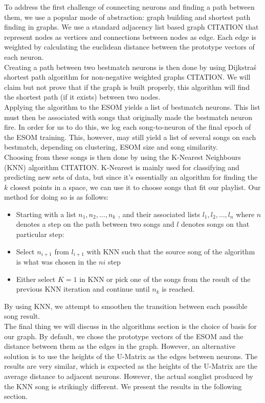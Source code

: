 To address the first challenge of connecting neurons and finding a path between them, we use a popular mode of abstraction: graph building and shortest path finding in graphs. We use a standard adjacency list based graph CITATION that represent nodes as vertices and connections between nodes as edge. Each edge is weighted by calculating the euclidean distance between the prototype vectors of each neuron. \\
Creating a path between two bestmatch neurons is then done by using Dijkstra\'s shortest path algorithm for non-negative weighted graphs CITATION. We will claim but not prove that if the graph is built properly, this algorithm will find the shortest path (if it exists) between two nodes. \\

Applying the algorithm to the ESOM yields a list of bestmatch neurons. This list must then be associated with songs that originally made the bestmatch neuron fire. In order for us to do this, we log each song-to-neuron of the final epoch of the ESOM training. This, however, may still yield a list of several songs on each bestmatch, depending on clustering, ESOM size and song similarity. \\
Choosing from these songs is then done by using the K-Nearest Neighbours (KNN) algorithm CITATION. K-Nearest is mainly used for classifying and predicting new sets of data, but since it's essentially an algorithm for finding the $k$ closest points in a space, we can use it to choose songs that fit our playlist. Our method for doing so is as follows:

\begin{itemize}
\item Starting with a list $ n_1, n_2, \dots, n_k $ , and their associated lists $ l_1, l_2, \dots, l_n $ where $n$ denotes a step on the path between two songs and $l$ denotes songs on that particular step: \\
\item Select $ n_{i+1} $ from $ l_{i+1} $ with KNN such that the source song of the algorithm is what was chosen in the $ n{i} $ step \\
\item Either select $K = 1$ in KNN or pick one of the songs from the result of the previous KNN iteration and continue until $n_k$ is reached.\\
\end{itemize}
By using KNN, we attempt to smoothen the transition between each possible song result. \\
The final thing we will discuss in the algorithms section is the choice of basis for our graph. By default, we chose 
the prototype vectors of the ESOM and the distance between them as the edges in the graph. However, an alternative solution is to use the heights of the U-Matrix as the edges between neurons. The results are very similar, which is expected as the heights of the U-Matrix are the average distance to adjacent neurons. However, the actual songlist produced by the KNN song is strikingly different. We present the results in the following section.

